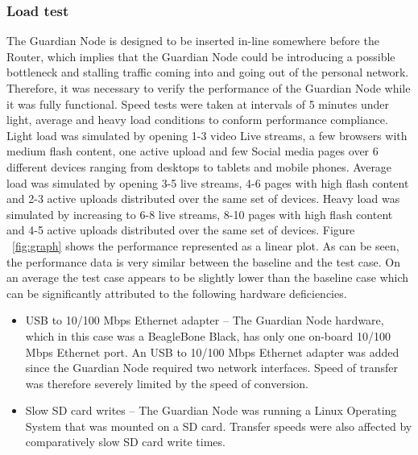 \subsubsection{Load test}
\label{sec:eval:loadtest}
The Guardian Node is designed to be inserted in-line somewhere before the Router, which implies that the Guardian Node could be introducing a possible bottleneck and stalling traffic coming into and going out of the personal network. Therefore, it was necessary to verify the performance of the Guardian Node while it was fully functional. Speed tests were taken at intervals of 5 minutes under light, average and heavy load conditions to conform performance compliance. Light load was simulated by opening 1-3 video Live streams, a few browsers with medium flash content, one active upload and few Social media pages over 6 different devices ranging from desktops to tablets and mobile phones. Average load was simulated by opening 3-5 live streams, 4-6 pages with high flash content and 2-3 active uploads distributed over the same set of devices. Heavy load was simulated by increasing to 6-8 live streams, 8-10 pages with high flash content and 4-5 active uploads distributed over the same set of devices. Figure ~\ref{fig:graph} shows the performance represented as a linear plot. As can be seen, the performance data is very similar between the baseline and the test case. On an average the test case appears to be slightly lower than the baseline case which can be significantly attributed to the following hardware deficiencies.
\begin{itemize}
    \item USB to 10/100 Mbps Ethernet adapter --
    The Guardian Node hardware, which in this case was a BeagleBone Black, has only one on-board 10/100 Mbps Ethernet port. An USB to 10/100 Mbps Ethernet adapter was added since the Guardian Node required two network interfaces. Speed of transfer was therefore severely limited by the speed of conversion.
    \item Slow SD card writes --
    The Guardian Node was running a Linux Operating System that was mounted on a SD card. Transfer speeds were also affected by comparatively slow SD card write times.
\end{itemize}


